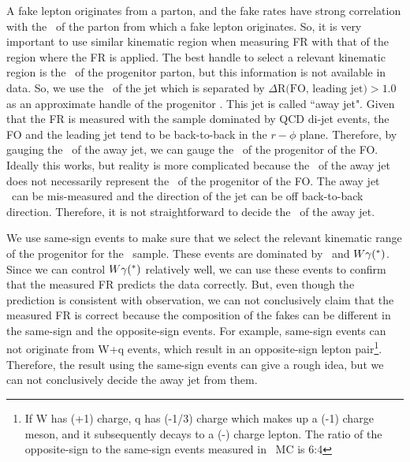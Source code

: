 A fake lepton originates from a parton, and the fake rates have strong 
correlation with the \pt\ of the parton from which a fake lepton originates.
So, it is very important to use similar kinematic region when measuring FR 
with that of the region where the FR is applied. The best handle to select 
a relevant kinematic region is the 
\pt\ of the progenitor parton, but this information is not available in data.   
So, we use the \pt\ of the jet which is separated by $\Delta \textrm{R(FO, leading jet)} > 1.0$
as an approximate handle of the progenitor \pt. This jet is called ``away jet".  
Given that the FR is measured with the sample dominated by QCD di-jet events, 
the FO and the leading jet tend to be back-to-back in the $r-\phi$ plane.
Therefore, by gauging the \pt\ of the away jet, we can gauge the \pt\ 
of the progenitor of the FO. Ideally this works, but reality is more 
complicated because the \pt\ of the away jet does not necessarily represent 
the \pt\ of the progenitor of the FO. The away jet \pt\ can be mis-measured 
and the direction of the jet can be off back-to-back direction.  
Therefore, it is not straightforward to decide the \pt\ of the away jet. 

We use same-sign events to make sure that we select the 
relevant kinematic range of the progenitor for the \Wjets\ sample. 
These events are dominated by \Wjets\ and $W\gamma(^*)$. 
Since we can control $W\gamma(^*)$
relatively well, we can use these events to confirm that the measured 
FR predicts the data correctly. 
But, even though the prediction is consistent with observation, 
we can not conclusively claim that the measured FR is correct 
because the composition of the fakes can be different in the same-sign 
and the opposite-sign events. 
For example, same-sign events can not originate from W+q events, 
which result in an opposite-sign lepton pair\footnote{If W has (+1) charge, 
q has (-1/3) charge which makes up a (-1) charge meson, and it subsequently decays 
to a (-) charge lepton. The ratio of the opposite-sign to the same-sign events 
measured in \Wjets\ MC is 6:4}. Therefore, the result using the same-sign events can 
give a rough idea, but we can not conclusively decide the away jet \pt from them. 

